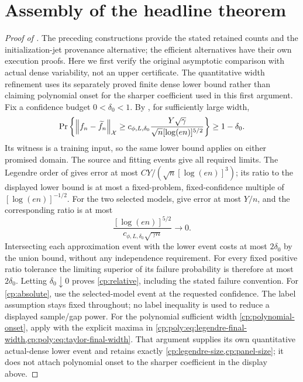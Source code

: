 \section{Assembly of the headline theorem}
\label{cp:assembly}
\begin{proof}[Proof of ]
The preceding constructions provide the stated retained counts and the
initialization-jet provenance alternative; the efficient alternatives have
their own execution proofs. Here we first verify the original asymptotic
comparison with actual dense variability, not an upper certificate. The
quantitative width refinement uses its separately proved finite dense lower
bound rather than claiming polynomial onset for the sharper coefficient
used in this first argument.
Fix a confidence budget $0<\delta_0<1$. By , for
sufficiently large width,
\[
 \Pr\left\{\left\lVert f_n-\widetilde f_n\right\rVert_{\mathcal X}
 \ge c_{\phi,L,\delta_0}
       \frac{Y\sqrt\gamma}{\sqrt n[\log(en)]^{5/2}}\right\}
 \ge1-\delta_0.
\]
Its witness is a training input, so the same lower bound applies on either
promised domain. The source and fitting events give all required limits.
The Legendre order of  gives error at most
$CY/(\sqrt n[\log(en)]^3)$; its ratio to the displayed lower bound is
at most a fixed-problem, fixed-confidence multiple of
$[\log(en)]^{-1/2}$. For the two selected models,
 give error at most $Y/n$, and the corresponding
ratio is at most
\[
 \frac{[\log(en)]^{5/2}}
 {c_{\phi,L,\delta_0}\sqrt{\gamma n}}\longrightarrow0.
\]
Intersecting each approximation event with the lower event costs at most
$2\delta_0$ by the union bound, without any independence requirement.
For every fixed positive ratio tolerance the limiting superior of its failure
probability is therefore at most $2\delta_0$. Letting $\delta_0\downarrow0$
proves \eqref{cp:relative}, including the stated failure convention.
For \eqref{cp:absolute}, use the selected-model event at the requested
confidence. The label assumption stays fixed throughout; no label inequality
is used to reduce a displayed sample/gap power.
For the polynomial sufficient width \eqref{cp:polynomial-onset}, apply
 with the explicit maxima in
\cref{cp:poly:eq:legendre-final-width,cp:poly:eq:taylor-final-width}.
That argument supplies its own quantitative actual-dense lower event and
retains exactly \cref{cp:legendre-size,cp:panel-size}; it does not attach
polynomial onset to the sharper coefficient in the display above.
\end{proof}




